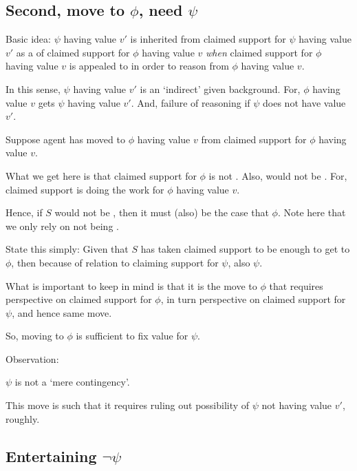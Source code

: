 \subsection{Second, move to \(\phi\), need \(\psi\)}

\begin{note}
  Basic idea:
  \(\psi\) having value \(v'\) is inherited from claimed support for \(\psi\) having value \(v'\) as a \requ{} of claimed support for \(\phi\) having value \(v\) \emph{when} claimed support for \(\phi\) having value \(v\) is appealed to in order to reason from \(\phi\) having value \(v\).

  In this sense, \(\psi\) having value \(v'\) is an `indirect' \requ{} given background.
  For, \(\phi\) having value \(v\) gets \(\psi\) having value \(v'\).
  And, failure of reasoning if \(\psi\) does not have value \(v'\).
\end{note}

\begin{note}
  Suppose agent has moved to \(\phi\) having value \(v\) from claimed support for \(\phi\) having value \(v\).

  What we get here is that claimed support for \(\phi\) is not \misled{}.
  Also, would not be \mistaken{}.
  For, claimed support is doing the work for \(\phi\) having value \(v\).


  Hence, if \(S\) would not be \mistaken{}, then it must (also) be the case that \(\phi\).
  Note here that we only rely on not being \misled{}.

  State this simply:
  Given that \(S\) has taken claimed support to be enough to get to \(\phi\), then because of relation to claiming support for \(\psi\), also \(\psi\).

  What is important to keep in mind is that it is the move to \(\phi\) that requires perspective on claimed support for \(\phi\), in turn perspective on claimed support for \(\psi\), and hence same move.

  So, moving to \(\phi\) is sufficient to fix value for \(\psi\).
\end{note}

\begin{note}
  Observation:

  \(\psi\) is not a `mere contingency'.

  This move is such that it requires ruling out possibility of \(\psi\) not having value \(v'\), roughly.
\end{note}

\subsection{Entertaining \(\lnot\psi\)}

